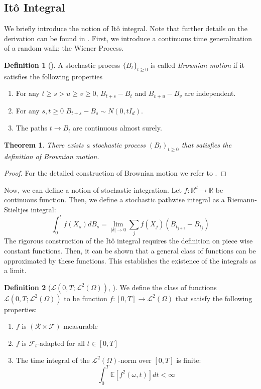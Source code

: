 \documentclass[12pt]{article}
\newtheorem{theorem}{Theorem}[section]
\theoremstyle{definition}
\newtheorem{definition}[definition]{Definition}
\numberwithin{equation}{section}
\newcommand{\R}{\mathbb{R}}
\newcommand{\CF}{\mathcal{F}}
\newcommand{\CL}{\mathcal{L}}
\newcommand{\CR}{\mathcal{R}}
\newcommand{\ev}[1]{\mathbb{E}\left[{#1}\right]}
\begin{document}
\subsection{Itô Integral}
\label{subsec:ItoIntegral}
We briefly introduce the notion of Itô integral. Note that further details on the derivation can be found in \autocite{eAppliedStochasticAnalysis2021}. 
First, we introduce a continuous time generalization of a random walk: the Wiener Process.
\begin{definition}[\autocite{durrettProbabilityTheoryExamples2019}]
  A stochastic process $\{B_t\}_{t \geq 0}$ is called \emph{Brownian motion} if it satisfies the following properties
  \begin{enumerate}[label=(\roman*)]
    \item For any $t \geq s > u \geq v \geq 0$, $B_{t+s} - B_t$ and $B_{v+u} - B_v$ are independent.
    \item For any $s,t \geq 0$ $B_{t+s} - B_s \sim N(0, tI_d)$.
    \item The paths $t \rightarrow B_t$ are continuous almost surely.
  \end{enumerate}
\end{definition}
\begin{theorem}
  There exists a stochastic process $(B_t)_{t \geq 0}$ that satisfies the definition of Brownian motion.
\end{theorem}
\begin{proof}
  For the detailed construction of Brownian motion we refer to \autocite{durrettProbabilityTheoryExamples2019}.
\end{proof}
Now, we can define a notion of stochastic integration. Let $f : \R^d \rightarrow \R$ be continuous function. Then, we define a stochastic pathwise integral as a Riemann-Stieltjes integral:
\begin{equation*}
  \int_0^t f(X_s) dB_s = \lim\limits_{|\delta| \rightarrow 0} \sum_j f(X_j)(B_{t_{j+1}} - B_{t_j})
\end{equation*}
The rigorous construction of the Itô integral requires the definition on piece wise constant functions. Then, it can be shown that a general class of functions can be approximated by these functions. This establishes the existence of the integrals as a limit.
\begin{definition}[$\CL(0,T;\CL^2(\Omega))$, ]
  We define the class of functions $\CL(0,T;\CL^2(\Omega))$ to be function $f : [0,T] \rightarrow \CL^2(\Omega)$ that satisfy the following properties:
  \begin{enumerate}
    \item $f$ is $(\CR \times \CF)$-measurable
    \item $f$ is $\CF_t$-adapted for all $t \in [0,T]$
    \item The time integral of the $\CL^2(\Omega)$-norm over $[0,T]$ is finite:
    \begin{equation*}
      \int_0^T \ev{f^2(\omega,t)}dt< \infty
    \end{equation*}
  \end{enumerate}
\end{definition}
\end{document}
